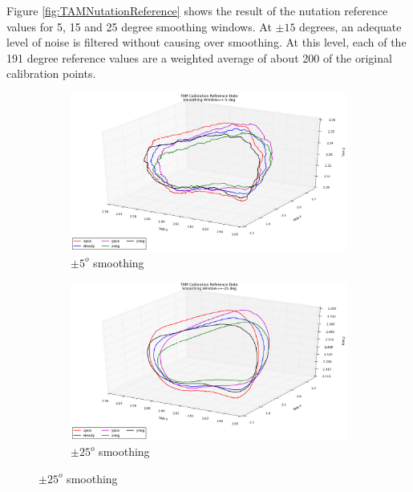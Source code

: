Figure \ref{fig:TAMNutationReference} shows the result of the nutation reference values for 5, 15 and 25 degree smoothing windows.  At $\pm 15$ degrees, an adequate level of noise is filtered without causing over smoothing.  At this level, each of the 191 degree reference values are a weighted average of about 200 of the original calibration points.

\begin{figure}[H]
  \begin{subfigure}[h!]{0.8\textwidth}
    \includegraphics[width=\textwidth]{figures/tam_calibration_ref_5deg_smoothing.eps}
    \caption{$\pm 5^o$ smoothing}
    \label{fig:TAM5degCalibration}
  \end{subfigure}

  \begin{subfigure}[h!]{0.8\textwidth}
    \includegraphics[width=\textwidth]{figures/tam_calibration_ref_25deg_smoothing.eps}
    \caption{$\pm 25^o$ smoothing}
    \label{fig:TAM25degCalibration}
  \end{subfigure}


\end{figure}
